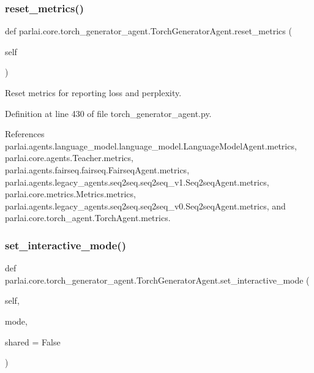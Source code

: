 \subsubsection{\texorpdfstring{reset\+\_\+metrics()}{reset\_metrics()}}
{\footnotesize\ttfamily def parlai.\+core.\+torch\+\_\+generator\+\_\+agent.\+Torch\+Generator\+Agent.\+reset\+\_\+metrics (\begin{DoxyParamCaption}\item[{}]{self }\end{DoxyParamCaption})}

\begin{DoxyVerb}Reset metrics for reporting loss and perplexity.\end{DoxyVerb}
 

Definition at line 430 of file torch\+\_\+generator\+\_\+agent.\+py.



References parlai.\+agents.\+language\+\_\+model.\+language\+\_\+model.\+Language\+Model\+Agent.\+metrics, parlai.\+core.\+agents.\+Teacher.\+metrics, parlai.\+agents.\+fairseq.\+fairseq.\+Fairseq\+Agent.\+metrics, parlai.\+agents.\+legacy\+\_\+agents.\+seq2seq.\+seq2seq\+\_\+v1.\+Seq2seq\+Agent.\+metrics, parlai.\+core.\+metrics.\+Metrics.\+metrics, parlai.\+agents.\+legacy\+\_\+agents.\+seq2seq.\+seq2seq\+\_\+v0.\+Seq2seq\+Agent.\+metrics, and parlai.\+core.\+torch\+\_\+agent.\+Torch\+Agent.\+metrics.

\mbox{\label{classparlai_1_1core_1_1torch__generator__agent_1_1TorchGeneratorAgent_a8a3c13d2b8988d2a0cbb71f44ae81f52}} 
\subsubsection{\texorpdfstring{set\+\_\+interactive\+\_\+mode()}{set\_interactive\_mode()}}
{\footnotesize\ttfamily def parlai.\+core.\+torch\+\_\+generator\+\_\+agent.\+Torch\+Generator\+Agent.\+set\+\_\+interactive\+\_\+mode (\begin{DoxyParamCaption}\item[{}]{self,  }\item[{}]{mode,  }\item[{}]{shared = {\ttfamily False} }\end{DoxyParamCaption})}

